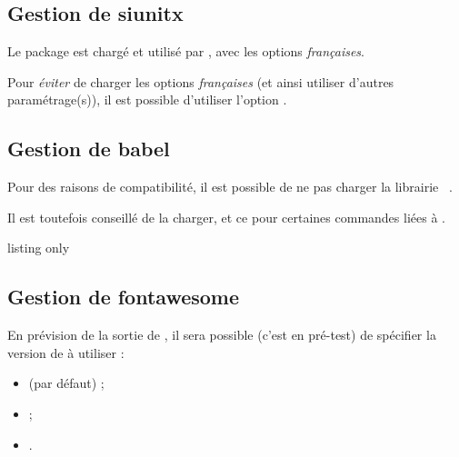 \subsection{Gestion de siunitx}

\begin{warningblock}
 Le package  est chargé et utilisé par , avec les options \textit{françaises}.

\smallskip

Pour \textit{éviter} de charger les options \textit{françaises} (et ainsi utiliser d'autres paramétrage(s)), il est possible d'utiliser l'option .
\end{warningblock}


\subsection{Gestion de babel}

\begin{warningblock}
 Pour des raisons de compatibilité, il est possible de ne pas charger la librairie \TikZ\ .

Il est toutefois conseillé de la charger, et ce pour certaines commandes liées à \TikZ.
\end{warningblock}

\begin{PresCodeTexPL}{listing only}
\usepackage[nonbabel]{ProfLycee}
\end{PresCodeTexPL}

\subsection{Gestion de fontawesome}

\begin{warningblock}
 En prévision de la sortie de , il sera possible (c'est en pré-test) de spécifier la version de  à utiliser :

\begin{itemize}
	\item {} (par défaut) ;
	\item {} ;
	\item {}.
\end{itemize}
\vspace*{-\baselineskip}\leavevmode
\end{warningblock}


